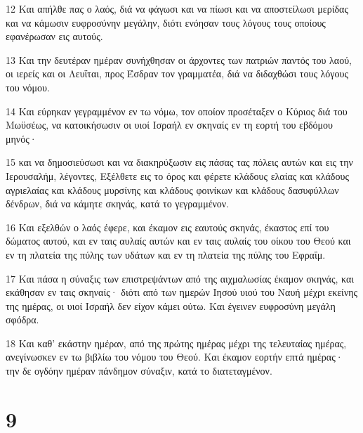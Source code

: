 \par 12 Και απήλθε πας ο λαός, διά να φάγωσι και να πίωσι και να αποστείλωσι μερίδας και να κάμωσιν ευφροσύνην μεγάλην, διότι ενόησαν τους λόγους τους οποίους εφανέρωσαν εις αυτούς.
\par 13 Και την δευτέραν ημέραν συνήχθησαν οι άρχοντες των πατριών παντός του λαού, οι ιερείς και οι Λευΐται, προς Έσδραν τον γραμματέα, διά να διδαχθώσι τους λόγους του νόμου.
\par 14 Και εύρηκαν γεγραμμένον εν τω νόμω, τον οποίον προσέταξεν ο Κύριος διά του Μωϋσέως, να κατοικήσωσιν οι υιοί Ισραήλ εν σκηναίς εν τη εορτή του εβδόμου μηνός·
\par 15 και να δημοσιεύσωσι και να διακηρύξωσιν εις πάσας τας πόλεις αυτών και εις την Ιερουσαλήμ, λέγοντες, Εξέλθετε εις το όρος και φέρετε κλάδους ελαίας και κλάδους αγριελαίας και κλάδους μυρσίνης και κλάδους φοινίκων και κλάδους δασυφύλλων δένδρων, διά να κάμητε σκηνάς, κατά το γεγραμμένον.
\par 16 Και εξελθών ο λαός έφερε, και έκαμον εις εαυτούς σκηνάς, έκαστος επί του δώματος αυτού, και εν ταις αυλαίς αυτών και εν ταις αυλαίς του οίκου του Θεού και εν τη πλατεία της πύλης των υδάτων και εν τη πλατεία της πύλης του Εφραΐμ.
\par 17 Και πάσα η σύναξις των επιστρεψάντων από της αιχμαλωσίας έκαμον σκηνάς, και εκάθησαν εν ταις σκηναίς· διότι από των ημερών Ιησού υιού του Ναυή μέχρι εκείνης της ημέρας, οι υιοί Ισραήλ δεν είχον κάμει ούτω. Και έγεινεν ευφροσύνη μεγάλη σφόδρα.
\par 18 Και καθ' εκάστην ημέραν, από της πρώτης ημέρας μέχρι της τελευταίας ημέρας, ανεγίνωσκεν εν τω βιβλίω του νόμου του Θεού. Και έκαμον εορτήν επτά ημέρας· την δε ογδόην ημέραν πάνδημον σύναξιν, κατά το διατεταγμένον.

\chapter{9}

